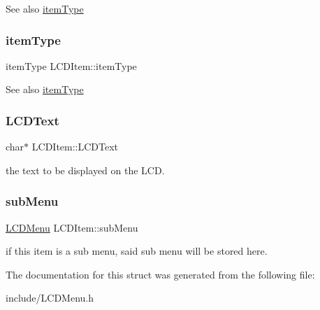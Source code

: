\begin{DoxySeeAlso}{See also}
\hyperlink{structLCDItem_ae5a432eb4dbd8f9a5c37174ba7122b0e}{item\+Type} 
\end{DoxySeeAlso}
\hypertarget{structLCDItem_ae5a432eb4dbd8f9a5c37174ba7122b0e}{}\label{structLCDItem_ae5a432eb4dbd8f9a5c37174ba7122b0e} 
\subsubsection{\texorpdfstring{item\+Type}{itemType}}
{\footnotesize\ttfamily item\+Type L\+C\+D\+Item\+::item\+Type}

\begin{DoxySeeAlso}{See also}
\hyperlink{structLCDItem_ae5a432eb4dbd8f9a5c37174ba7122b0e}{item\+Type} 
\end{DoxySeeAlso}
\hypertarget{structLCDItem_a07022062a6c79e504d46d9f968ab693d}{}\label{structLCDItem_a07022062a6c79e504d46d9f968ab693d} 
\subsubsection{\texorpdfstring{L\+C\+D\+Text}{LCDText}}
{\footnotesize\ttfamily char$\ast$ L\+C\+D\+Item\+::\+L\+C\+D\+Text}

the text to be displayed on the L\+CD. \hypertarget{structLCDItem_af072bed397a22183aeba429a133f489d}{}\label{structLCDItem_af072bed397a22183aeba429a133f489d} 
\subsubsection{\texorpdfstring{sub\+Menu}{subMenu}}
{\footnotesize\ttfamily \hyperlink{structLCDMenu}{L\+C\+D\+Menu} L\+C\+D\+Item\+::sub\+Menu}

if this item is a sub menu, said sub menu will be stored here. 

The documentation for this struct was generated from the following file\+:\begin{DoxyCompactItemize}
\item 
include/L\+C\+D\+Menu.\+h\end{DoxyCompactItemize}

